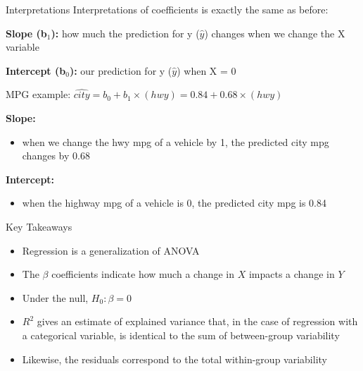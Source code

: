 \documentclass{beamer}
\begin{document}
\begin{frame}{Interpretations}
Interpretations of coefficients is exactly the same as before: \vspace{4mm}

\textbf{Slope (b$_1$):} how much the prediction for y ($\hat{y}$) changes when we change the X variable \vspace{2mm}

\textbf{Intercept (b$_0$):} our prediction for y ($\hat{y}$) when X = 0 \vspace{14mm}

MPG example: $\widehat{city} = b_0 + b_1 \times (hwy) = 0.84 + 0.68 \times (hwy)$ \vspace{2mm}

\textbf{Slope:}
\begin{itemize}
    \item when we change the hwy mpg of a vehicle by 1, the predicted city mpg changes by 0.68
\end{itemize} \vspace{2mm}

\textbf{Intercept:}
\begin{itemize}
    \item when the highway mpg of a vehicle is 0, the predicted city mpg is 0.84
\end{itemize}
    
\end{frame}


\begin{frame}{Key Takeaways}
\begin{itemize}
\item Regression is a generalization of ANOVA
\item The $\beta$ coefficients indicate how much a change in $X$ impacts a change in $Y$
\item Under the null, $H_0: \beta = 0$ 
\item $R^2$ gives an estimate of explained variance that, in the case of regression with a categorical variable, is identical to the sum of between-group variability
\item Likewise, the residuals correspond to the total within-group variability
\end{itemize}
\end{frame}

%
%
\end{document}
